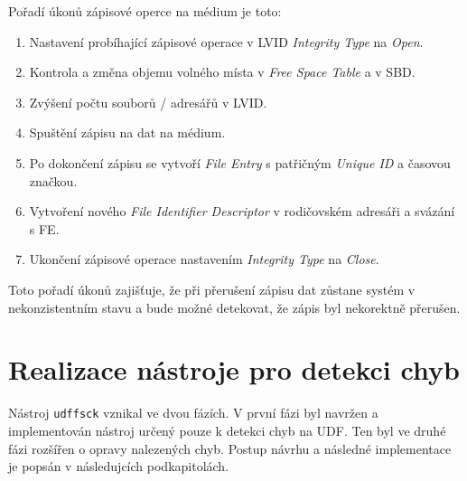 Pořadí úkonů zápisové operce na médium je toto:
\begin{enumerate}
    \item Nastavení probíhající zápisové operace v LVID \textit{Integrity Type} na \textit{Open}.
    \item Kontrola a změna objemu volného místa v \textit{Free Space Table} a v SBD.
    \item Zvýšení počtu souborů / adresářů v LVID.
    \item Spuštění zápisu na dat na médium.
    \item Po dokončení zápisu se vytvoří \textit{File Entry} s patřičným \textit{Unique ID} a časovou značkou. 
    \item Vytvoření nového \textit{File Identifier Descriptor} v rodičovském adresáři a svázání s FE.
    \item Ukončení zápisové operace nastavením \textit{Integrity Type} na \textit{Close}.
\end{enumerate}
Toto pořadí úkonů zajišťuje, že při přerušení zápisu dat zůstane systém v nekonzistentním stavu a bude možné detekovat, že zápis byl nekorektně přerušen.

\chapter{Realizace nástroje pro detekci chyb}
\label{ch:realizace}
Nástroj \texttt{udffsck} vznikal ve dvou fázích. V první fázi byl navržen a implementován nástroj určený pouze k detekci chyb na UDF. Ten byl ve druhé fázi rozšířen o opravy nalezených chyb. Postup návrhu a následné implementace je popsán v následujcích podkapitolách.

